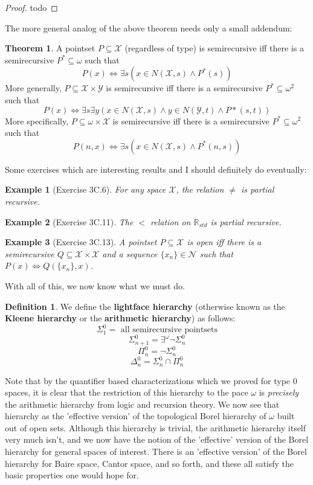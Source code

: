 \documentclass{article}
\theoremstyle{definition}
\newtheorem{definition}{Definition}[section]
\newtheorem{theorem}{Theorem}[section]
\theoremstyle{plain}
\newtheorem{example}{Example}
\begin{document}
\begin{proof}
    todo
\end{proof}
The more general analog of the above theorem needs only a small addendum:
\begin{theorem}
    A pointset $P \subseteq \mathcal{X}$ (regardless of type) is semirecursive iff there is a semirecursive $P^*\subseteq \omega$ such that 
    \[ P(x) \iff \exists s (x \in N(\mathcal{X},s) \wedge P^*(s)) \]
    More generally, $P \subseteq \mathcal{X} \times \mathcal{Y}$ is semirecursive iff there is a semirecursive $P^* \subseteq \omega^2$ such that 
    \[ P(x) \iff \exists s \exists y (x \in N(\mathcal{X},s) \wedge y \in N(\mathcal{Y},t) \wedge P*(s,t)) \]
    More specifically, $P \subseteq \omega \times \mathcal{X}$ is semirecursive iff there is a semirecursive $P^* \subseteq \omega^2$ such that 
    \[ P(n,x) \iff \exists s (x \in N(\mathcal{X},s) \wedge P^*(n,s)) \]
\end{theorem}
Some exercises which are interesting results and I should definitely do eventually:
\begin{example}[Exercise 3C.6]
    For any space $\mathcal{X}$, the relation $\neq$ is partial recursive. 
\end{example}
\begin{example}[Exercise 3C.11]
    The $<$ relation on $\mathbb{R}_{std}$ is partial recursive.
\end{example}
\begin{example}[Exercise 3C.13]
    A pointset $P \subseteq \mathcal{X}$ is open iff there is a semirecursive $Q \subseteq \mathcal{X} \times \mathcal{X}$ and a sequence $\{x_n\} \in \mathcal{N}$ such that $P(x) \iff Q(\{x_n\},x)$. 
\end{example}
With all of this, we now know what we must do. 
\begin{definition}
    We define the \textbf{lightface hierarchy} (otherwise known as the \textbf{Kleene hierarchy} or the \textbf{arithmetic hierarchy}) as follows:
    \[ \Sigma_1^0 = \textrm{ all semirecursive pointsets} \]
    \[ \Sigma^0_{n+1} = \exists^{\omega} \neg \Sigma^0_n \]
    \[ \Pi_n^0 = \neg \Sigma^0_n \]
    \[ \Delta^0_n = \Sigma^0_n \cap \Pi^0_n \]
\end{definition}
Note that by the quantifier based characterizations which we proved for type 0 spaces, it is clear that the restriction of this hierarchy to the pace $\omega$ is \textit{precisely} the arithmetic hierarchy from logic and recursion theory. We now see that hierarchy as the 'effective version' of the topological Borel hierarchy of $\omega$ built out of open sets. Although this hierarchy is trivial, the arithmetic hierarchy itself very much isn't, and we now have the notion of the 'effective' version of the Borel hierarchy for general spaces of interest. There is an 'effective version' of the Borel hierarchy for Baire space, Cantor space, and so forth, and these all satisfy the basic properties one would hope for.  
\end{document}
